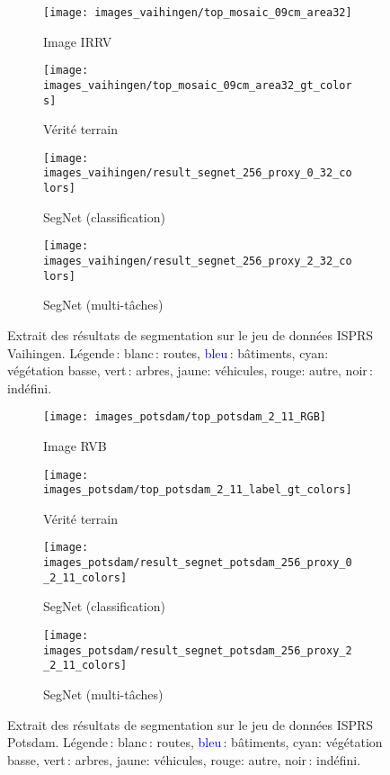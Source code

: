 \begin{figure*}[t]
\begin{subfigure}{0.24\textwidth}
	\texttt{[image: images\_vaihingen/top\_mosaic\_09cm\_area32]}
    \caption{Image IRRV}
\end{subfigure}
\begin{subfigure}{0.24\textwidth}
	\texttt{[image: images\_vaihingen/top\_mosaic\_09cm\_area32\_gt\_colors]}
    \caption{Vérité terrain}
\end{subfigure}
\begin{subfigure}{0.24\textwidth}
	\texttt{[image: images\_vaihingen/result\_segnet\_256\_proxy\_0\_32\_colors]}
    \caption{SegNet (classification)}
\end{subfigure}
\begin{subfigure}{0.24\textwidth}
	\texttt{[image: images\_vaihingen/result\_segnet\_256\_proxy\_2\_32\_colors]}
    \caption{SegNet (multi-tâches)}
\end{subfigure}
\caption{Extrait des résultats de segmentation sur le jeu de données ISPRS Vaihingen. \small{Légende\,: blanc\,: routes, \textcolor{Blue}{bleu}\,: bâtiments, \textcolor{Cerulean}{cyan}: végétation basse, \textcolor{OliveGreen}{vert}\,: arbres, \textcolor{Dandelion}{jaune}: véhicules, \textcolor{BrickRed}{rouge}: autre}, noir\,: indéfini.}
\label{fig:isprs_vaihingen}
\end{figure*}

\begin{figure*}[t]
\begin{subfigure}{0.24\textwidth}
	\texttt{[image: images\_potsdam/top\_potsdam\_2\_11\_RGB]}
    \caption{Image RVB}
\end{subfigure}
\hfill
\begin{subfigure}{0.24\textwidth}
	\texttt{[image: images\_potsdam/top\_potsdam\_2\_11\_label\_gt\_colors]}
    \caption{Vérité terrain}
\end{subfigure}
\hfill
\begin{subfigure}{0.24\textwidth}
	\texttt{[image: images\_potsdam/result\_segnet\_potsdam\_256\_proxy\_0\_2\_11\_colors]}
    \caption{SegNet (classification)}
\end{subfigure}
\hfill
\begin{subfigure}{0.24\textwidth}
	\texttt{[image: images\_potsdam/result\_segnet\_potsdam\_256\_proxy\_2\_2\_11\_colors]}
    \caption{SegNet (multi-tâches)}
\end{subfigure}
\caption{Extrait des résultats de segmentation sur le jeu de données ISPRS Potsdam. \small{Légende\,: blanc\,: routes, \textcolor{Blue}{bleu}\,: bâtiments, \textcolor{Cerulean}{cyan}: végétation basse, \textcolor{OliveGreen}{vert}\,: arbres, \textcolor{Dandelion}{jaune}: véhicules, \textcolor{BrickRed}{rouge}: autre}, noir\,: indéfini.}
\label{fig:isprs_potsdam}
\end{figure*}

